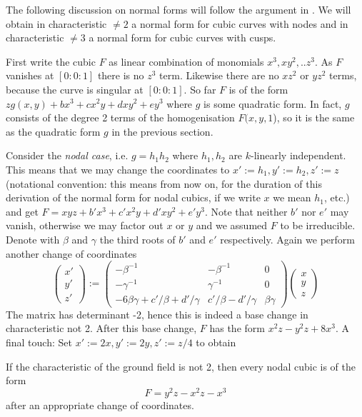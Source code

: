 The following discussion on normal forms will follow the argument in \cite[Satz 4.9, p.102]{hulek2000elementare}.
We will obtain in characteristic $\neq 2$ a normal form for cubic curves with nodes and in characteristic $\neq 3$ a normal form for cubic curves with cusps.

First write the cubic $F$ as linear combination of monomials $x^3,xy^2,..z^3$.
As $F$ vanishes at $[0:0:1]$ there is no $z^3$ term.
Likewise there are no $xz^2$ or $yz^2$ terms, because the curve is singular at $[0:0:1]$.
So far $F$ is of the form $zg(x,y) + bx^3 + cx^2y + dxy^2 + ey^3$ where $g$ is some quadratic form.
In fact, $g$ consists of the degree 2 terms of the homogenisation $F(x,y,1$), so it is the same as the quadratic form $g$ in the previous section.

Consider the \emph{nodal case}, i.e. $g=h_1h_2$ where $h_1,h_2$ are $k$-linearly independent.
This means that we may change the coordinates to $x':=h_1, y':=h_2, z':=z$ (notational convention: this means from now on, for the duration of this derivation of the normal form for nodal cubics, if we write $x$ we mean $h_1$, etc.) and get $F = xyz + b'x^3 + c'x^2y + d'xy^2 + e'y^3$.
Note that neither $b'$ nor $e'$ may vanish, otherwise we may factor out $x$ or $y$ and we assumed $F$ to be irreducible.
Denote with $\beta$ and $\gamma$ the third roots of $b'$ and $e'$ respectively.
Again we perform another change of coordinates
\begin{equation}
\begin{pmatrix} x' \\ y' \\ z' \end{pmatrix}
:=
\begin{pmatrix}
-\beta^{-1} & -\beta^{-1} & 0 \\
-\gamma^{-1} & \gamma^{-1} & 0 \\
-6\beta\gamma + c'/\beta + d'/\gamma & c'/\beta - d'/\gamma & \beta\gamma
\end{pmatrix}
\begin{pmatrix} x \\ y \\ z \end{pmatrix}
\end{equation}
The matrix has determinant -2, hence this is indeed a base change in characteristic not 2.
After this base change, $F$ has the form $x^2z - y^2z +8x^3$.
A final touch: Set $x' := 2x, y':= 2y,z':=z/4$ to obtain
\begin{proposition} \label{propositionNormalformNodal}
If the characteristic of the ground field is not 2, then every nodal cubic is of the form
\begin{equation}
F = y^2z - x^2z - x^3
\end{equation}
after an appropriate change of coordinates.
\end{proposition}

